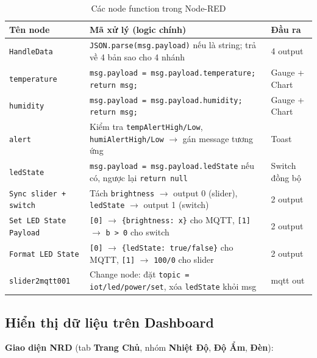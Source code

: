 \documentclass[13pt,a4paper]{article}
\newcommand{\code}[1]{\texttt{#1}}
\begin{document}
\begin{table}[htbp]
    \centering
    \caption{Các node function trong Node-RED}
    \label{tbl:nodes}
    \begin{tabular}{|L{4.5cm}|C{6cm}|C{3.5cm}|}
        \hline
        \textbf{Tên node} & \textbf{Mã xử lý (logic chính)} & \textbf{Đầu ra} \\
        \hline
        \code{HandleData} & \code{JSON.parse(msg.payload)} nếu là string; trả về 4 bản sao cho 4 nhánh & 4 output \\
        \hline
        \code{temperature} & \code{msg.payload = msg.payload.temperature; return msg;} & Gauge + Chart \\
        \hline
        \code{humidity} & \code{msg.payload = msg.payload.humidity; return msg;} & Gauge + Chart \\
        \hline
        \code{alert} & Kiểm tra \code{tempAlertHigh/Low}, \code{humiAlertHigh/Low} $\rightarrow$ gán message tương ứng & Toast \\
        \hline
        \code{ledState} & \code{msg.payload = msg.payload.ledState} nếu có, ngược lại \code{return null} & Switch đồng bộ \\
        \hline
        \code{Sync slider + switch} & Tách \code{brightness} $\rightarrow$ output 0 (slider), \code{ledState} $\rightarrow$ output 1 (switch) & 2 output \\
        \hline
        \code{Set LED State Payload} & \code{[0]} $\rightarrow$ \code{\{brightness: x\}} cho MQTT, \code{[1]} $\rightarrow$ \code{b > 0} cho switch & 2 output \\
        \hline
        \code{Format LED State} & \code{[0]} $\rightarrow$ \code{\{ledState: true/false\}} cho MQTT, \code{[1]} $\rightarrow$ \code{100/0} cho slider & 2 output \\
        \hline
        \code{slider2mqtt001} & Change node: đặt \code{topic = iot/led/power/set}, xóa \code{ledState} khỏi msg & mqtt out \\
        \hline
    \end{tabular}
\end{table}

\subsection{Hiển thị dữ liệu trên Dashboard}
\label{sec:dashboard}

\textbf{Giao diện NRD} (tab \textbf{Trang Chủ}, nhóm \textbf{Nhiệt Độ}, \textbf{Độ Ẩm}, \textbf{Đèn}):
\end{document}

